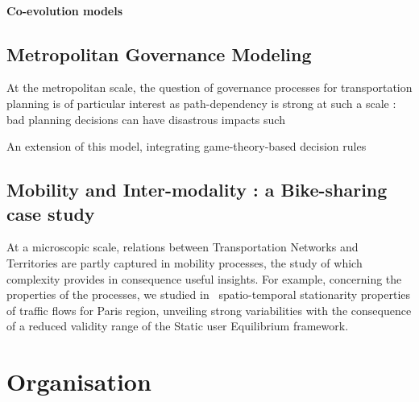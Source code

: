\paragraph{Co-evolution models}



\subsection{Metropolitan Governance Modeling}


At the metropolitan scale, the question of governance processes for transportation planning is of particular interest as path-dependency is strong at such a scale : bad planning decisions can have disastrous impacts such 

An extension of this model, integrating game-theory-based decision rules 
\cite{lenechet:halshs-01272236}


\subsection{Mobility and Inter-modality : a Bike-sharing case study}


At a microscopic scale, relations between Transportation Networks and Territories are partly captured in mobility processes, the study of which complexity provides in consequence useful insights. For example, concerning the properties of the processes, we studied in~\cite{} %
 spatio-temporal stationarity properties of traffic flows for Paris region, unveiling strong variabilities with the consequence of a reduced validity range of the Static user Equilibrium framework.






\section{Organisation}















